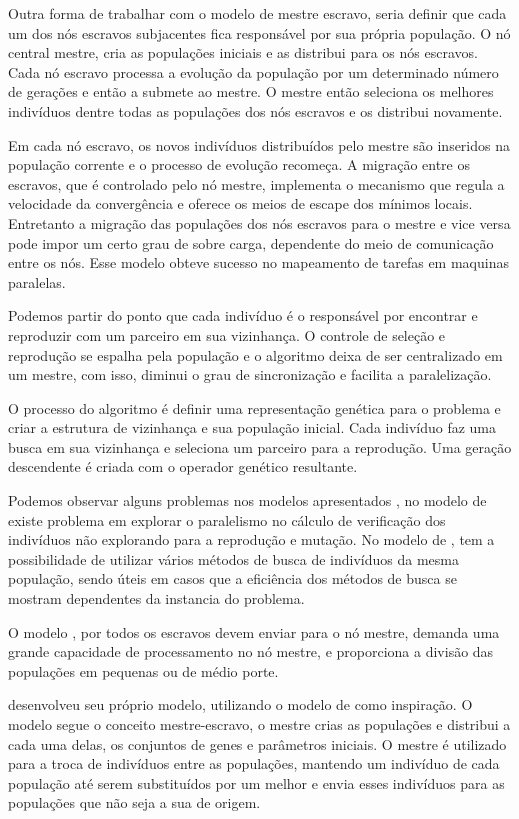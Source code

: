Outra forma de trabalhar com o modelo de mestre escravo, seria definir que cada um dos nós escravos subjacentes fica responsável por sua própria população. O nó central mestre, cria as populações iniciais e as distribui para os nós escravos. Cada nó escravo processa a evolução da população por um determinado número de gerações e então a submete ao mestre. O mestre então seleciona os melhores indivíduos dentre todas as populações dos nós escravos e os distribui novamente. 

Em cada nó escravo, os novos indivíduos distribuídos pelo mestre são inseridos na população corrente e o processo de evolução recomeça. A migração entre os escravos, que é controlado pelo nó mestre, implementa o mecanismo que regula a velocidade da convergência e oferece os meios de escape dos mínimos locais. Entretanto a migração das populações dos nós escravos para o mestre e vice versa pode impor um certo grau de sobre carga, dependente do meio de comunicação entre os nós. Esse modelo obteve sucesso no mapeamento de tarefas em maquinas paralelas. \cite{Alaoui}

Podemos partir do ponto que cada indivíduo é o responsável por encontrar e reproduzir com um parceiro em sua vizinhança. O controle de seleção e reprodução se espalha pela população e o algoritmo deixa de ser centralizado em um mestre, com isso, diminui o grau de sincronização e facilita a paralelização. 

O processo do algoritmo é definir uma representação genética para o problema e criar a estrutura de vizinhança e sua população inicial. Cada indivíduo faz uma busca em sua vizinhança e seleciona um parceiro para a reprodução. Uma geração descendente é criada com o operador genético resultante. \cite{Heinz}

Podemos observar alguns problemas nos modelos apresentados \cite{Vilson}, no modelo de \cite{Jason} existe problema em explorar o paralelismo no cálculo de verificação dos indivíduos não explorando para a reprodução e mutação. No modelo de \cite{Heinz}, tem a possibilidade de utilizar vários métodos de busca de indivíduos da mesma população, sendo úteis em casos que a eficiência dos métodos de busca se mostram dependentes da instancia do problema. 

O modelo \cite{Alaoui}, por todos os escravos devem enviar para o nó mestre, demanda uma grande capacidade de processamento no nó mestre, e proporciona a divisão das populações em pequenas ou de médio porte.

 \cite{Vilson} desenvolveu seu próprio modelo, utilizando o modelo de \cite{Alaoui} como inspiração. O modelo segue o conceito mestre-escravo, o mestre crias as populações e distribui a cada uma delas, os conjuntos de genes e parâmetros iniciais. O mestre é utilizado para a troca de indivíduos entre as populações, mantendo um indivíduo de cada população até serem substituídos por um melhor e envia esses indivíduos para as populações que não seja a sua de origem. 
 
